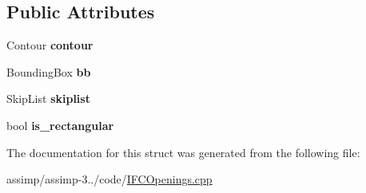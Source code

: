 \subsection*{Public Attributes}
\begin{DoxyCompactItemize}
\item 
\hypertarget{struct_assimp_1_1_i_f_c_1_1_projected_window_contour_ac7fdf06db78674b2e3d6bd06d786b395}{Contour {\bfseries contour}}\label{struct_assimp_1_1_i_f_c_1_1_projected_window_contour_ac7fdf06db78674b2e3d6bd06d786b395}

\item 
\hypertarget{struct_assimp_1_1_i_f_c_1_1_projected_window_contour_ae43418a394234502a3f514cc8bf73fe8}{Bounding\+Box {\bfseries bb}}\label{struct_assimp_1_1_i_f_c_1_1_projected_window_contour_ae43418a394234502a3f514cc8bf73fe8}

\item 
\hypertarget{struct_assimp_1_1_i_f_c_1_1_projected_window_contour_a2fef2b3a7e2245bb995bdbd4469c7a91}{Skip\+List {\bfseries skiplist}}\label{struct_assimp_1_1_i_f_c_1_1_projected_window_contour_a2fef2b3a7e2245bb995bdbd4469c7a91}

\item 
\hypertarget{struct_assimp_1_1_i_f_c_1_1_projected_window_contour_a882294a2422c27f61401511f6e79da5a}{bool {\bfseries is\+\_\+rectangular}}\label{struct_assimp_1_1_i_f_c_1_1_projected_window_contour_a882294a2422c27f61401511f6e79da5a}

\end{DoxyCompactItemize}


The documentation for this struct was generated from the following file\+:\begin{DoxyCompactItemize}
\item 
assimp/assimp-\/3../code/\hyperlink{_i_f_c_openings_8cpp}{I\+F\+C\+Openings.\+cpp}\end{DoxyCompactItemize}
